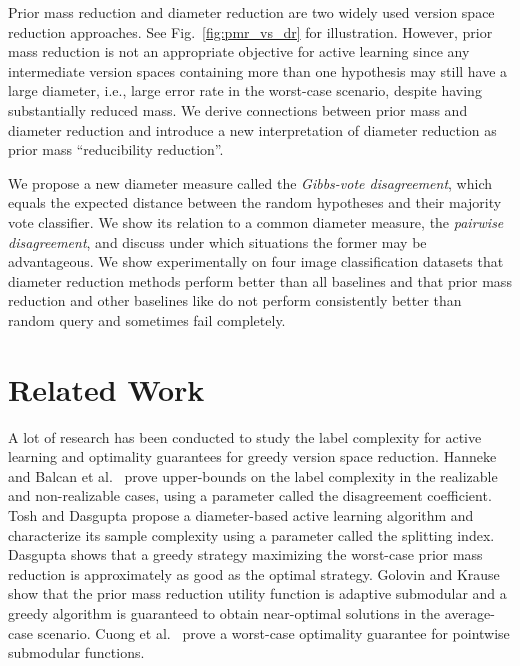 \documentclass[runningheads, envcountsame, a4paper]{llncs}
\newcommand{\etal}{et al.}
\newcommand{\ie}{i.e.}
\begin{document}
Prior mass reduction \cite{Dasgupta05,Golovin10,Cuong13} and diameter reduction \cite{Dasgupta06,Tosh17} are two widely used version space reduction approaches. See Fig.~\ref{fig:pmr_vs_dr} for illustration. However, prior mass reduction is not an appropriate objective for active learning 
\cite{Tosh17} since any intermediate version spaces containing more than one hypothesis may still have a large diameter, \ie, large error rate in the worst-case scenario, despite having substantially reduced mass. We derive connections between prior mass and diameter reduction and introduce a new interpretation of diameter reduction as prior mass ``reducibility reduction''.

We propose a new diameter measure called the \textit{Gibbs-vote disagreement}, which equals the expected distance between the random hypotheses and their majority vote classifier. We show its relation to a common diameter measure, the \textit{pairwise disagreement}, and discuss under which situations the former may be advantageous. We show experimentally on four image classification datasets that diameter reduction methods perform better than all baselines and that prior mass reduction \cite{Dasgupta05,Golovin10,Cuong13} and other baselines like \cite{Houlsby11,Gal17,Sener18,Ducoffe18} do not perform consistently better than random query and sometimes fail completely.

\section{Related Work}
\label{sec:related_work}

A lot of research has been conducted to study the label complexity for active learning and optimality guarantees for greedy version space reduction. Hanneke \cite{Hanneke07} and Balcan \etal~\cite{Balcan09} prove upper-bounds on the label complexity in the realizable and non-realizable cases, using a parameter called the disagreement coefficient. Tosh and Dasgupta \cite{Tosh17} propose a diameter-based active learning algorithm and characterize its sample complexity using a parameter called the splitting index. Dasgupta \cite{Dasgupta05} shows that a greedy strategy maximizing the worst-case prior mass reduction is approximately as good as the optimal strategy. Golovin and Krause \cite{Golovin10} show that the prior mass reduction utility function is adaptive submodular and a greedy algorithm is guaranteed to obtain near-optimal solutions in the average-case scenario. Cuong \etal~\cite{Cuong14} prove a worst-case optimality guarantee for pointwise submodular functions. 
\end{document}
